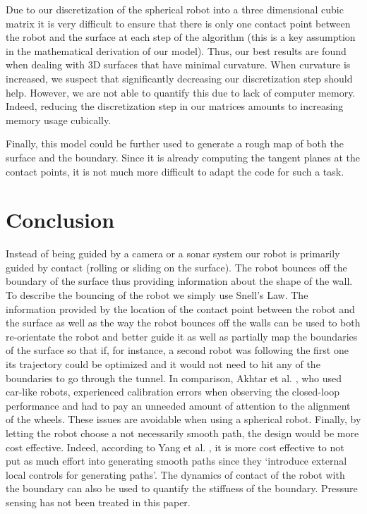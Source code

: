 \documentclass[journal]{IEEEtran}
\begin{document}
Due to our discretization of the spherical robot into a three dimensional cubic matrix it is very difficult to ensure that there is only one contact point between the robot and the surface at each step of the algorithm (this is a key assumption in the mathematical derivation of our model). Thus, our best results are found when dealing with 3D surfaces that have minimal curvature. When curvature is increased, we suspect that significantly decreasing our discretization step should help. However, we are not able to quantify this due to lack of computer memory. Indeed, reducing the discretization step in our matrices amounts to increasing memory usage cubically.

Finally, this model could be further used to generate a rough map of both the surface and the boundary. Since it is already computing the tangent planes at the contact points, it is not much more difficult to adapt the code for such a task.

\section{Conclusion} 
Instead of being guided by a camera or a sonar system our robot is primarily guided by contact (rolling or sliding on the surface). The robot bounces off the boundary of the surface thus providing information about the shape of the wall. To describe the bouncing of the robot we simply use Snell's Law. The information provided by the location of the contact point between the robot and the surface as well as the way the robot bounces off the walls can be used to both re-orientate the robot and better guide it as well as partially map the boundaries of the surface so that if, for instance, a second robot was following the first one its trajectory could be optimized and it would not need to hit any of the boundaries to go through the tunnel. 
In comparison, Akhtar et al. \cite{Akhtar15}, who used car-like robots, experienced calibration errors when observing the closed-loop performance and had to pay an unneeded amount of attention to the alignment of the wheels. These issues are avoidable when using a spherical robot. Finally, by letting the robot choose a not necessarily smooth path, the design would be more cost effective. Indeed, according to Yang et al. \cite{Yang15}, it is more cost effective to not put as much effort into generating smooth paths since they `introduce external local controls for generating paths'. The dynamics of contact of the robot with the boundary can also be used to quantify the stiffness of the boundary. Pressure sensing has not been treated in this paper.
\end{document}

